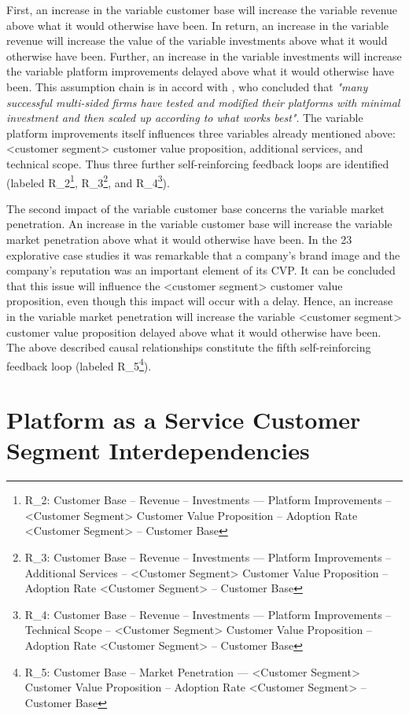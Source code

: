 First, an increase in the variable customer base will increase the variable revenue above what it would otherwise have been. In return, an increase in the variable revenue will increase the value of the variable investments above what it would otherwise have been. Further, an increase in the variable investments will increase the variable platform improvements delayed above what it would otherwise have been. This assumption chain is in accord with \citet[p. 200]{Evans2003}, who concluded that \textit{"many successful multi-sided firms have tested and modified their platforms with minimal investment and then scaled up according to what works best"}. The variable platform improvements itself influences three variables already mentioned above: <customer segment> customer value proposition, additional services, and technical scope. Thus three further self-reinforcing feedback loops are identified (labeled R\_2\footnote{R\_2: Customer Base -- Revenue -- Investments --- Platform Improvements -- <Customer Segment> Customer Value Proposition -- Adoption Rate <Customer Segment> -- Customer Base}, R\_3\footnote{R\_3: Customer Base -- Revenue -- Investments --- Platform Improvements -- Additional Services -- <Customer Segment> Customer Value Proposition -- Adoption Rate <Customer Segment> -- Customer Base}, and R\_4\footnote{R\_4: Customer Base -- Revenue -- Investments --- Platform Improvements -- Technical Scope -- <Customer Segment> Customer Value Proposition -- Adoption Rate <Customer Segment> -- Customer Base}).

The second impact of the variable customer base concerns the variable market penetration. An increase in the variable customer base will increase the variable market penetration above what it would otherwise have been. In the 23 explorative case studies it was remarkable that a company's brand image and the company's reputation was an important element of its \ac{CVP}. It can be concluded that this issue will influence the <customer segment> customer value proposition, even though this impact will occur with a delay. Hence, an increase in the variable market penetration will increase the variable <customer segment> customer value proposition delayed above what it would otherwise have been. The above described causal relationships constitute the fifth self-reinforcing feedback loop (labeled R\_5\footnote{R\_5: Customer Base -- Market Penetration --- <Customer Segment> Customer Value Proposition -- Adoption Rate <Customer Segment> -- Customer Base}).

\section{Platform as a Service Customer Segment Interdependencies}\label{ch:cld:csi}


